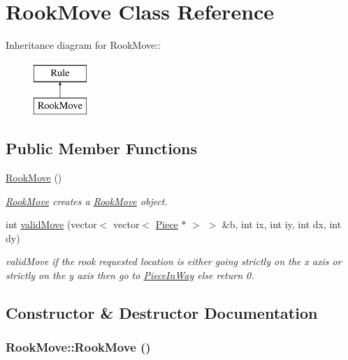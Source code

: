 \hypertarget{classRookMove}{
\section{RookMove Class Reference}
\label{classRookMove}
}
Inheritance diagram for RookMove::\begin{figure}[H]
\begin{center}
\leavevmode
\includegraphics[height=2cm]{classRookMove}
\end{center}
\end{figure}
\subsection*{Public Member Functions}
\begin{DoxyCompactItemize}
\item 
\hyperlink{classRookMove_a74a07da059bd2a7dd2a8a644500efe8c}{RookMove} ()
\begin{DoxyCompactList}\small\item\em \hyperlink{classRookMove}{RookMove} creates a \hyperlink{classRookMove}{RookMove} object. \item\end{DoxyCompactList}\item 
int \hyperlink{classRookMove_a3b985caef5be53996c71ff3427816b68}{validMove} (vector$<$ vector$<$ \hyperlink{classPiece}{Piece} $\ast$ $>$ $>$ \&b, int ix, int iy, int dx, int dy)
\begin{DoxyCompactList}\small\item\em validMove if the rook requested location is either going strictly on the x axis or strictly on the y axis then go to \hyperlink{classPieceInWay}{PieceInWay} else return 0. \item\end{DoxyCompactList}\end{DoxyCompactItemize}


\subsection{Constructor \& Destructor Documentation}
\hypertarget{classRookMove_a74a07da059bd2a7dd2a8a644500efe8c}{
\subsubsection[{RookMove}]{\setlength{\rightskip}{0pt plus 5cm}RookMove::RookMove ()}}
\label{classRookMove_a74a07da059bd2a7dd2a8a644500efe8c}


